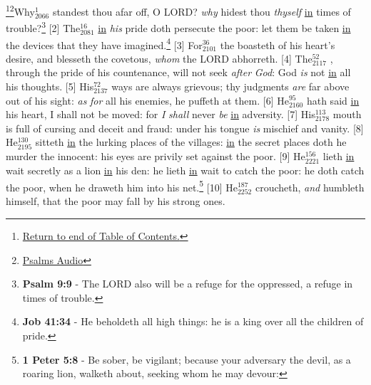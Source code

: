 \footnote{\textcolor[cmyk]{0.99998,1,0,0}{\hyperlink{TOC}{Return to end of Table of Contents.}}}\footnote{\href{https://audiobible.com/bible/genesis_30.html}{\textcolor[cmyk]{0.99998,1,0,0}{Psalms Audio}}}\textcolor[cmyk]{0.99998,1,0,0}{Why\textcolor{jungle}{$_{2066}^{1}$} standest thou afar off, O LORD? \emph{why} hidest thou \emph{thyself} \underline{in} times of trouble?}\footnote{\textbf{Psalm 9:9} - The LORD also will be a refuge for the oppressed, a refuge in times of trouble.}
[2] \textcolor[cmyk]{0.99998,1,0,0}{The\textcolor{jungle}{$_{2081}^{16}$}  \underline{in} \emph{his} pride doth persecute the poor: let them be taken \underline{in} the devices that they have imagined.}\footnote{\textbf{Job 41:34} - He beholdeth all high things: he is a king over all the children of pride.}
[3] \textcolor[cmyk]{0.99998,1,0,0}{For\textcolor{jungle}{$_{2101}^{36}$} the  boasteth of his heart's desire, and blesseth the covetous, \emph{whom} the LORD abhorreth.}
[4] \textcolor[cmyk]{0.99998,1,0,0}{The\textcolor{jungle}{$_{2117}^{52}$} , through the pride of his countenance, will not seek \emph{after} \emph{God}: God \emph{is} not \underline{in} all his thoughts.}
[5] \textcolor[cmyk]{0.99998,1,0,0}{His\textcolor{jungle}{$_{2137}^{72}$} ways are always grievous; thy judgments \emph{are} far above out of his sight: \emph{as} \emph{for} all his enemies, he puffeth at them.}
[6] \textcolor[cmyk]{0.99998,1,0,0}{He\textcolor{jungle}{$_{2160}^{95}$} hath said \underline{in} his heart, I shall not be moved: for \emph{I} \emph{shall} never \emph{be} \underline{in} adversity.}
[7] \textcolor[cmyk]{0.99998,1,0,0}{His\textcolor{jungle}{$_{2178}^{113}$} mouth is full of cursing and deceit and fraud: under his tongue \emph{is} mischief and vanity.}
[8] \textcolor[cmyk]{0.99998,1,0,0}{He\textcolor{jungle}{$_{2195}^{130}$} sitteth \underline{in} the lurking places of the villages: \underline{in} the secret places doth he murder the innocent: his eyes are privily set against the poor.}
[9] \textcolor[cmyk]{0.99998,1,0,0}{He\textcolor{jungle}{$_{2221}^{156}$} lieth \underline{in} wait secretly as a lion \underline{in} his den: he lieth \underline{in} wait to catch the poor: he doth catch the poor, when he draweth him into his net.}\footnote{\textbf{1 Peter 5:8} - Be sober, be vigilant; because your adversary the devil, as a roaring lion, walketh about, seeking whom he may devour:}
[10] \textcolor[cmyk]{0.99998,1,0,0}{He\textcolor{jungle}{$_{2252}^{187}$} croucheth, \emph{and} humbleth himself, that the poor may fall by his strong ones.}
